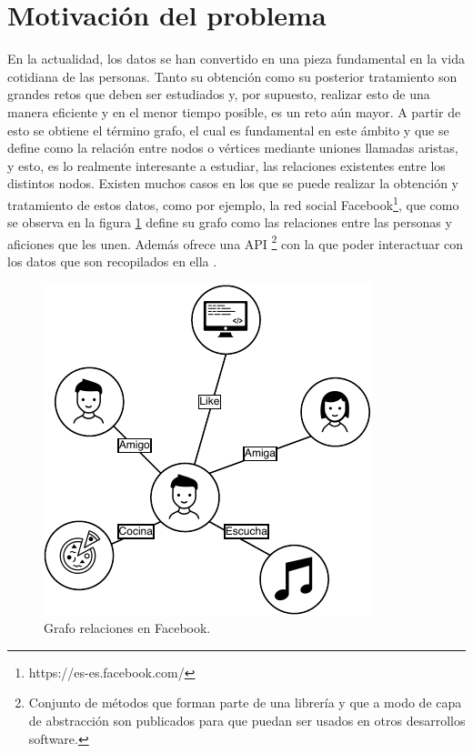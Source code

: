 \section{Motivación del problema}

En la actualidad, los datos se han convertido en una pieza fundamental en la vida cotidiana de las personas. Tanto su obtención como su posterior tratamiento son grandes retos que deben ser estudiados y, por supuesto, realizar esto de una manera eficiente y en el menor tiempo posible, es un reto aún mayor. A partir de esto se obtiene el término grafo, el cual es fundamental en este ámbito y que se define como la relación entre nodos o vértices mediante uniones llamadas aristas, y esto, es lo realmente interesante a estudiar, las relaciones existentes entre los distintos nodos.\newline
Existen muchos casos en los que se puede realizar la obtención y tratamiento de estos datos, como por ejemplo, la red social Facebook\footnote{https://es-es.facebook.com/}, que como se observa en la figura \ref{fig:facebook-graph} define su grafo como las relaciones entre las personas y aficiones que les unen. Además ofrece una \gls{API} \footnote{Conjunto de métodos que forman parte de una librería y que a modo de capa de abstracción son publicados para que puedan ser usados en otros desarrollos software.} con la que poder interactuar con los datos que son recopilados en ella \cite{api-graph}.

 \begin{figure}[H]
	\centering
	\includegraphics{Figures/facebook-graph.pdf}
	\caption{Grafo relaciones en Facebook.}
	\label{fig:facebook-graph}
\end{figure}

